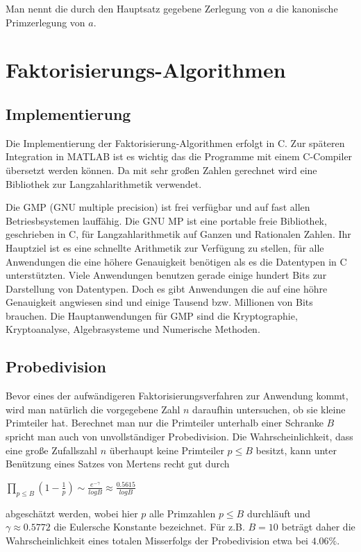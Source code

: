 \documentclass[10pt, bigheadings]{scrartcl}
\begin{document}
Man nennt die durch den Hauptsatz gegebene Zerlegung von $a$ die
kanonische Primzerlegung von $a$.

\newpage

\section{Faktorisierungs-Algorithmen}
\subsection{Implementierung}
Die Implementierung der Faktorisierung-Algorithmen erfolgt in C. Zur
späteren Integration in MATLAB ist es wichtig das die Programme mit
einem C-Compiler übersetzt werden können. Da mit sehr großen Zahlen
gerechnet wird eine Bibliothek zur Langzahlarithmetik verwendet.

Die GMP (GNU multiple precision) ist frei verfügbar und auf fast allen
Betriesbsystemen lauffähig. Die GNU MP ist eine portable freie Bibliothek,
geschrieben in C, für Langzahlarithmetik auf Ganzen und Rationalen Zahlen.
Ihr Hauptziel ist es eine schnellte Arithmetik zur Verfügung zu stellen,
für alle Anwendungen die eine höhere Genauigkeit benötigen als es die
Datentypen in C unterstützten.
Viele Anwendungen benutzen gerade einige hundert Bits zur Darstellung
von Datentypen. Doch es gibt Anwendungen die auf eine höhre Genauigkeit
angwiesen sind und einige Tausend bzw. Millionen von Bits brauchen. Die
Hauptanwendungen für GMP sind die Kryptographie, Kryptoanalyse,
Algebrasysteme und Numerische Methoden.

\subsection{Probedivision}
Bevor eines der aufwändigeren Faktorisierungsverfahren zur Anwendung
kommt, wird man natürlich die vorgegebene Zahl $n$ daraufhin
untersuchen, ob sie kleine Primteiler hat. Berechnet man nur die
Primteiler unterhalb einer Schranke $B$ spricht man auch von
unvollständiger Probedivision. Die Wahrscheinlichkeit, dass eine
große Zufallszahl $n$ überhaupt keine Primteiler $p\leq B$ besitzt,
kann unter Benützung eines Satzes von Mertens recht gut durch
\begin{center}
$ \prod_{p\leq B} (1- \frac{1}{p})\sim \frac{e^{-\gamma}}{log B} \approx
\frac{0.5615}{log B}$
\end{center}
abgeschätzt werden, wobei hier $p$ alle Primzahlen $p\leq B$ durchläuft und
$\gamma \approx 0.5772$ die Eulersche Konstante bezeichnet. Für z.B. $B=10$
beträgt daher die Wahrscheinlichkeit eines totalen Misserfolgs der
Probedivision etwa bei $4.06\%$.
\end{document}
